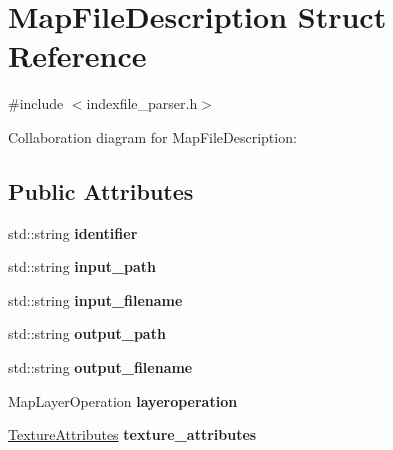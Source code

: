 \hypertarget{struct_map_file_description}{\section{Map\+File\+Description Struct Reference}
\label{struct_map_file_description}
}


{\ttfamily \#include $<$indexfile\+\_\+parser.\+h$>$}



Collaboration diagram for Map\+File\+Description\+:
\subsection*{Public Attributes}
\begin{DoxyCompactItemize}
\item 
\hypertarget{struct_map_file_description_a54c7431a163c2fda9768035db496b433}{std\+::string {\bfseries identifier}}\label{struct_map_file_description_a54c7431a163c2fda9768035db496b433}

\item 
\hypertarget{struct_map_file_description_a257fb709f3391a7a75fc9efe85ba4407}{std\+::string {\bfseries input\+\_\+path}}\label{struct_map_file_description_a257fb709f3391a7a75fc9efe85ba4407}

\item 
\hypertarget{struct_map_file_description_a63962f46fcbb240600be4387e368c516}{std\+::string {\bfseries input\+\_\+filename}}\label{struct_map_file_description_a63962f46fcbb240600be4387e368c516}

\item 
\hypertarget{struct_map_file_description_a0d6513085d55d2497d7986ee896f0ae1}{std\+::string {\bfseries output\+\_\+path}}\label{struct_map_file_description_a0d6513085d55d2497d7986ee896f0ae1}

\item 
\hypertarget{struct_map_file_description_a16d4845d3376e6f187986364702de848}{std\+::string {\bfseries output\+\_\+filename}}\label{struct_map_file_description_a16d4845d3376e6f187986364702de848}

\item 
\hypertarget{struct_map_file_description_abb3895d1836c0bda42448a4d802cdb11}{Map\+Layer\+Operation {\bfseries layeroperation}}\label{struct_map_file_description_abb3895d1836c0bda42448a4d802cdb11}

\item 
\hypertarget{struct_map_file_description_a30b7d70ec00e78d587dce01e89e3021b}{\hyperlink{struct_texture_attributes}{Texture\+Attributes} {\bfseries texture\+\_\+attributes}}\label{struct_map_file_description_a30b7d70ec00e78d587dce01e89e3021b}


\end{DoxyCompactItemize}
